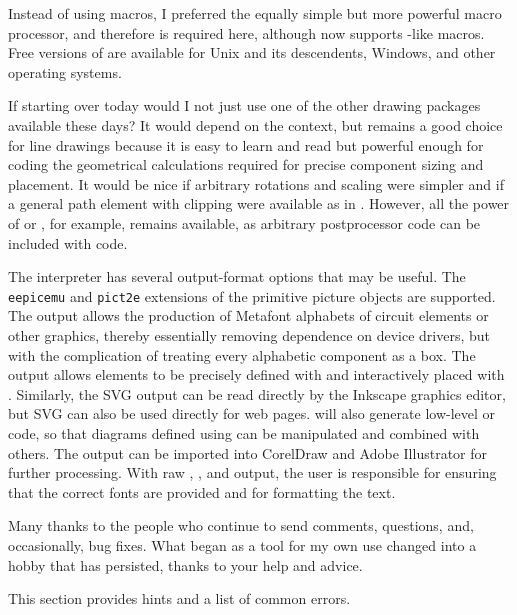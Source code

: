 Instead of using \pic macros, I preferred the equally simple but more
powerful \Mfour macro processor, and therefore \Mfour is required here,
although \dpic  now supports \pic-like macros.
Free versions of \Mfour are available
for Unix and its descendents, Windows, and other operating systems.

If starting over today would I not just use one of the other drawing
packages available these days?  It would depend on the context, but \pic
remains a good choice for line drawings because it is easy to learn
and read but powerful enough for coding the geometrical calculations
required for precise component sizing and placement. It would be nice
if arbitrary rotations and scaling were simpler and if a general path
element with clipping were available as in \Postscript.  However,
all the power of \Postscript or \TPGF, for example, remains available,
as arbitrary postprocessor code can be included with \pic code.

The \dpic interpreter has several output-format options that may be
useful.  The {\tt eepicemu} and {\tt pict2e} extensions of the
primitive \latex picture objects are supported.  The \mfpic output
allows the production of Metafont alphabets of circuit elements or
other graphics, thereby essentially removing dependence on device
drivers, but with the complication of treating every alphabetic
component as a \tex box.  The \xfig output allows elements to be
precisely defined with \dpic  and interactively placed with \xfig.
Similarly, the SVG output can be read directly by the Inkscape graphics
editor, but SVG can also be used directly for web pages.
\Dpic will also generate low-level \MetaPost or \Postscript code, so
that diagrams defined using \pic can be manipulated and combined with
others.  The \Postscript output can be imported into
CorelDraw
and Adobe Illustrator
for further processing.
With raw \Postscript, \PDF, and \SVG output, the user is
responsible for ensuring that the correct fonts are provided and for
formatting the text.

Many thanks to the people who continue to send comments, questions,
and, occasionally, bug fixes. What began as a tool for my own use changed
into a hobby that has persisted, thanks to your help and advice.

This section provides hints and a list of common errors.

